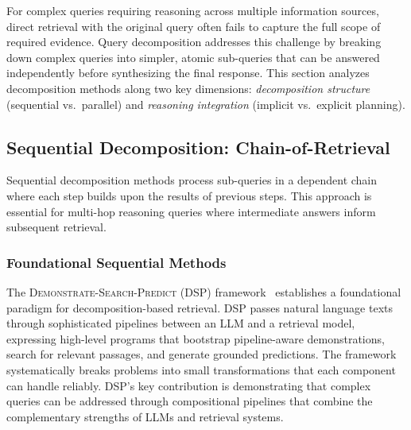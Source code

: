 \documentclass{article}
\begin{document}
For complex queries requiring reasoning across multiple information sources, direct retrieval with the original query often fails to capture the full scope of required evidence. Query decomposition addresses this challenge by breaking down complex queries into simpler, atomic sub-queries that can be answered independently before synthesizing the final response. This section analyzes decomposition methods along two key dimensions: \textit{decomposition structure} (sequential vs.\ parallel) and \textit{reasoning integration} (implicit vs.\ explicit planning).

\vspace{0.3em}
\noindent{}
\vspace{0.3em}

\subsection{Sequential Decomposition: Chain-of-Retrieval}

Sequential decomposition methods process sub-queries in a dependent chain where each step builds upon the results of previous steps. This approach is essential for multi-hop reasoning queries where intermediate answers inform subsequent retrieval.

\subsubsection{Foundational Sequential Methods}

The \textsc{Demonstrate-Search-Predict (DSP)} framework~\citep{Demonstrate-Search-Predict} establishes a foundational paradigm for decomposition-based retrieval. DSP passes natural language texts through sophisticated pipelines between an LLM and a retrieval model, expressing high-level programs that bootstrap pipeline-aware demonstrations, search for relevant passages, and generate grounded predictions. The framework systematically breaks problems into small transformations that each component can handle reliably. DSP's key contribution is demonstrating that complex queries can be addressed through compositional pipelines that combine the complementary strengths of LLMs and retrieval systems.
\end{document}
